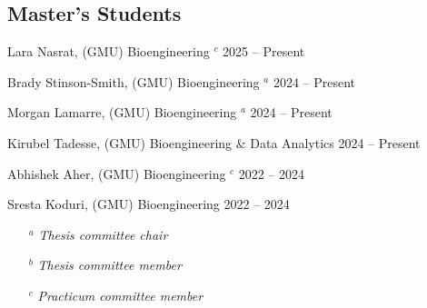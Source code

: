 \documentclass[letterpaper, 10pt]{article}
\begin{document}
\subsection{\textbf{Master's Students}}
\begin{compacthang}
     \item Lara Nasrat, (GMU) Bioengineering $^{c}$ \hfill 2025 -- Present
     \item Brady Stinson-Smith, (GMU) Bioengineering $^{a}$ \hfill 2024 -- Present
     \item Morgan Lamarre, (GMU) Bioengineering $^{a}$ \hfill 2024 -- Present
	\item Kirubel Tadesse, (GMU) Bioengineering \& Data Analytics \hfill 2024 -- Present
     \item Abhishek Aher, (GMU) Bioengineering  $^{c}$ \hfill 2022 -- 2024
	\item Sresta Koduri, (GMU) Bioengineering \hfill 2022 -- 2024
     \begin{itemize}
	     \item[$^{a}$] \textit{\small Thesis committee chair}
	     \item[$^{b}$] \textit{\small Thesis committee member}
    	     \item[$^{c}$] \textit{\small Practicum committee member}
     \end{itemize}	
\end{compacthang}

\end{document}
